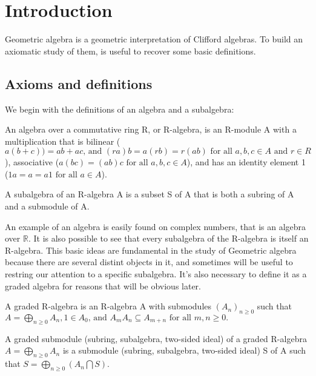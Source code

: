 \chapter{Introduction} 
\label{introduction}

Geometric algebra is a geometric interpretation of Clifford algebras. To build an axiomatic study of them, is useful to recover some basic definitions.

\section{Axioms and definitions}

We begin with the definitions\cite{Grillet07} of an algebra and a subalgebra:

\begin{definition}
An algebra over a commutative ring R, or R-algebra, is an R-module A with a multiplication that is bilinear ($a(b+c))= ab + ac\mbox{, and } (ra) b = a (rb) = r (ab)\mbox{ for all } a, b, c \in A \mbox{ and } r \in R$), associative ($a (bc) = (ab) c \mbox{ for all } a, b, c \in A$), and has an identity element 1 ($1a = a = a1 \mbox{ for all } a \in A$).
\end{definition}

\begin {definition}
A subalgebra of an R-algebra A is a subset S of A that is both a
subring of A and a submodule of A.
\end{definition}

An example of an algebra is easily found on complex numbers, that is an algebra over $\mathbb{R}$. It is also possible to see that every subalgebra of the R-algebra is itself an R-algebra. This basic ideas are fundamental in the study of Geometric algebra because there are several distint objects in it, and sometimes will be useful to restring our attention to a specific subalgebra. It's also necessary to define it as a graded algebra for reasons that will be obvious later.

\begin{definition}
A graded R-algebra is an R-algebra A with submodules $(A_n)_{n\ge0}$ such that $A = \bigoplus_{n\ge0} A_n , 1 \in A_0 \mbox{, and } A_m A_n \subseteq A_{m+n} \mbox{ for all } m, n \ge 0.$
\end{definition}

\begin{definition}
A graded submodule (subring, subalgebra, two-sided ideal) of a
graded R-algebra $A = \bigoplus_{n\ge0} A_n$ is a submodule (subring, subalgebra, two-sided ideal) S of A such that $ S = \bigoplus_{n\ge0} (A_n \bigcap S)$.
\end{definition}

